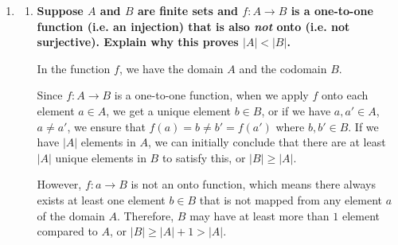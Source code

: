 \documentclass[10pt]{article}
\begin{document}
\begin{enumerate}
\begin{enumerate}
With a partition $D \in P^2_{n,k}$, we have a sequence of non-increasing positive integers that sum up to $n$, and there exists at least two parts that are equal to $k$ in the sequence. We can simply remove one part $k$ from this sequence. Therefore, we have a new sequence $D'$ with at least one part that has the largest value and it is equal to $k$. The sum of this sequence is $n-k$. This new sequence $D'$ belongs to $P'_{n-k,k}$ accordingly.

Therefore, we can find a bijection $g:P^2_{n,k} \mapsto P'_{n-k,k}$, or $|P^2_{n,k}|=|P'_{n-k,k}|$.

With every partition $P \in P'_{n-1,k-1}$, we can construct a unique partition that belongs to $P'_{n,k}$ and has only one largest part that is equal to $k$. With every partition $P \in P'_{n-k,k}$, we can construct a unique partition that belongs to $P'_{n,k}$ and has at least two parts that are equal to $k$. Because every partition in $P'_{n,k}$ must belong to exactly one of these two subsets, the total number of partitions $p'(n,k)$ is 

$$|P'_{n,k}| = |P'_{n-1,k-1}|+ |P'_{n-k,k}|$$

Therefore, we can conclude that

$$p'(n,k)=p'(n-1,k-1)+p'(n-k,k).$$


\end{enumerate}
\vskip 2cm

\item
\begin{enumerate}
\item
\textbf{Suppose $A$ and $B$ are finite sets and $f:A\to B$ is a one-to-one function (i.e. an injection) that is also {\it not} onto (i.e. not surjective).  Explain why this proves $|A| < |B|$.}

In the function $f$, we have the domain $A$ and the codomain $B$. 

Since $f:A \to B$ is a one-to-one function, when we apply $f$ onto each element $a \in A$, we get a unique element $b \in B$, or if we have $a, a' \in A$, $a \neq a'$, we ensure that $f(a)=b \neq b' = f(a')$ where $b, b' \in B$. If we have $|A|$ elements in $A$, we can initially conclude that there are at least $|A|$ unique elements in $B$ to satisfy this, or $|B| \geq |A|$.

However, $f:a \to B$ is not an onto function, which means there always exists at least one element $b \in B$ that is not mapped from any element $a$ of the domain $A$. Therefore, $B$ may have at least more than $1$ element compared to $A$, or $|B| \geq |A| + 1 > |A|$.


\end{enumerate}
\end{enumerate}
\end{document}
